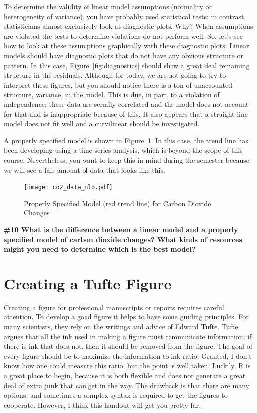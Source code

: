 \documentclass{tufte-handout}\usepackage[]{graphicx}\usepackage[]{xcolor}
\begin{document}
To determine the validity of linear model assumptions (\eg normality or heterogeneity of variance), you have probably used statistical tests; in contrast statisticians almost exclusively look at diagnostic plots. Why?  When assumptions are violated the tests to determine violations do not perform well. So, let's see how to look at these assumptions graphically with these diagnostic plots. Linear models should have diagnostic plots that do not have any obvious structure or pattern. In this case, Figure~\ref{fig:diagnostics} should show a great deal remaining structure in the residuals. Although for today, we are not going to try to interpret these figures, but you should notice there is a ton of unaccounted structure, \ie variance, in the model. This is due, in part, to a violation of independence; these data are serially correlated and the model does not account for that and is inappropriate because of this. It also appears that a straight-line model does not fit well and a curvilinear should be investigated. 

A properly specified model is shown in Figure~\ref{fig:co2_data_mlo}. In this case, the trend line has been developing using a time series analysis, which is beyond the scope of this course. Nevertheless, you want to keep this in mind during the semester because we will see a fair amount of data that looks like this.

\begin{figure}
	\texttt{[image: co2\_data\_mlo.pdf]}
	\caption{Properly Specified Model (red trend line) for Carbon Dioxide Changes}
	\label{fig:co2_data_mlo}
\end{figure}

\bigskip
\noindent \textbf{\#10 What is the difference between a linear model and a properly specified model of carbon dioxide changes?  What kinds of resources might you need to determine which is the best model?}

\section{Creating a Tufte Figure}

Creating a figure for professional manuscripts or reports requires careful attention. To develop a good figure it helps to have some guiding principles. For many scientists, they rely on the writings and advice of Edward Tufte. Tufte argues that all the ink used in making a figure must communicate information; if there is ink that does not, then it should be removed from the figure. The goal of every figure should be to maximize the information to ink ratio. Granted, I don't know how one could measure this ratio, but the point is well taken. Luckily, R is a great place to begin, because it is both flexible and does not generate a great deal of extra junk that can get in the way. The drawback is that there are many options; and sometimes a complex syntax is required to get the figures to cooperate. However, I think this handout will get you pretty far.  
\end{document}
